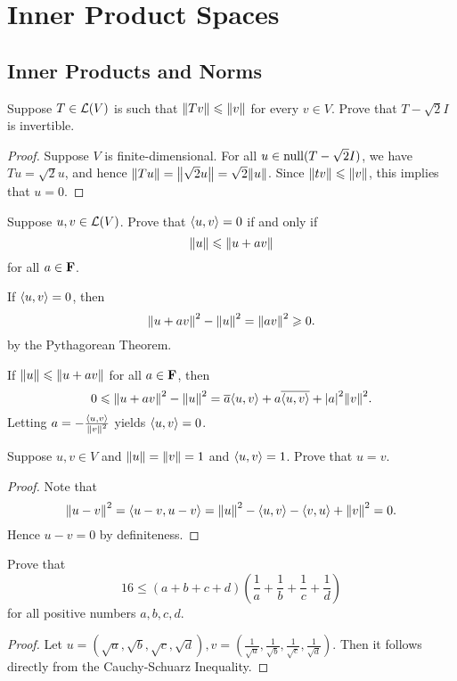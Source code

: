 \chapter{Inner Product Spaces}

\section{Inner Products and Norms}

\begin{exercise}{5}
	Suppose $T \in \operatorname{\mathcal{L}}(V)$ is such that $\norm{Tv} \le \norm{v}$ for every $v \in V$. Prove that $T-\sqrt{2}I$ is invertible.
\end{exercise}

\begin{proof}
	Suppose $V$ is finite-dimensional. For all $u \in \operatorname{null}(T - \sqrt{2}I)$, we have $Tu = \sqrt{2}u$, and hence $\norm{Tu} = \norm{\sqrt{2}u} = \sqrt{2}\norm{u}$. Since $\norm{tv} \le \norm{v}$, this implies that $u = 0$.
\end{proof}

\begin{exercise}{6}
	Suppose $u, v \in \operatorname{\mathcal{L}}(V)$. Prove that $\inp{u}{v} = 0$ if and only if
	\[
		\norm{u} \le \norm{u + av}
	\]
	for all $a \in \mathbf{F}$.
\end{exercise}

\begin{solution}
	If $\inp{u}{v} = 0$, then
	\[
		\norm{u + av}^{2} - \norm{u}^{2} = \norm{av}^{2} \ge 0.
	\]
	by the Pythagorean Theorem.

	If $\norm{u} \le \norm{u + av}$ for all $a \in \mathbf{F}$, then
	\[
		0 \le \norm{u + av}^{2} - \norm{u}^{2} = \conj{a}\inp{u}{v} + a\conj{\inp{u}{v}} + \abs{a}^{2}\norm{v}^{2}.
	\]
	Letting $a = -\frac{\inp{u}{v}}{\norm{v}^{2}}$ yields $\inp{u}{v} = 0$.
\end{solution}

\begin{exercise}{8}
	Suppose $u, v \in V$ and $\norm{u} = \norm{v} = 1$ and $\inp{u}{v} = 1$. Prove that $u = v$.
\end{exercise}

\begin{proof}
	Note that
	\[
		\norm{u - v}^{2} = \inp{u - v}{u - v} = \norm{u}^{2} - \inp{u}{v} - \inp{v}{u} + \norm{v}^{2} = 0.
	\]
	Hence $u - v = 0$ by definiteness.
\end{proof}

\begin{exercise}{11}
	Prove that
	\[
		16 \le (a + b + c + d)\left(\frac{1}{a} + \frac{1}{b} + \frac{1}{c} + \frac{1}{d}\right)
	\]
	for all positive numbers $a, b, c, d$.
\end{exercise}

\begin{proof}
	Let $u = \left(\sqrt{a}, \sqrt{b}, \sqrt{c}, \sqrt{d}\right), v = \left(\frac{1}{\sqrt{a}}, \frac{1}{\sqrt{b}}, \frac{1}{\sqrt{c}}, \frac{1}{\sqrt{d}}\right)$. Then it follows directly from the Cauchy-Schuarz Inequality.
\end{proof}
